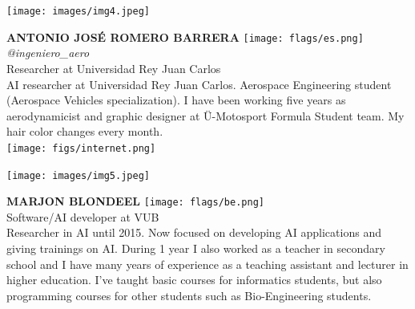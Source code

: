 \documentclass[11pt]{article}
\begin{document}
\noindent
\begin{minipage}{0.3\textwidth}
\centering
\texttt{[image: images/img4.jpeg]}
\end{minipage}
\hfill
\begin{minipage}{0.6\textwidth}\raggedright
\color{color1}\uppercase{\textbf{Antonio José Romero Barrera}}
\color{color2}\hspace{0.2cm}\texttt{[image: flags/es.png]}
\hspace{0.2cm}\textit{@ingeniero\_aero}
\\
Researcher at Universidad Rey Juan Carlos\\
{\footnotesize AI researcher at Universidad Rey Juan Carlos. Aerospace Engineering student (Aerospace Vehicles specialization). I have been working five years as aerodynamicist and graphic designer at Ü-Motosport Formula Student team. My hair color changes every month.}\\
\texttt{[image: figs/internet.png]}
\end{minipage}
\newline\newline\newline

\noindent
\begin{minipage}{0.3\textwidth}
\centering
\texttt{[image: images/img5.jpeg]}
\end{minipage}
\hfill
\begin{minipage}{0.6\textwidth}\raggedright
\color{color1}\uppercase{\textbf{Marjon Blondeel}}
\color{color2}\hspace{0.2cm}\texttt{[image: flags/be.png]}
\\
Software/AI developer at VUB\\
{\footnotesize Researcher in AI until 2015. Now focused on developing AI applications and giving trainings on AI. During 1 year I also worked as a teacher in secondary school and I have many years of experience as a teaching assistant and lecturer in higher education. I've taught basic courses for informatics students, but also programming courses for other students such as Bio-Engineering students. }\\
\end{minipage}
\newline\newline\newline
\end{document}
